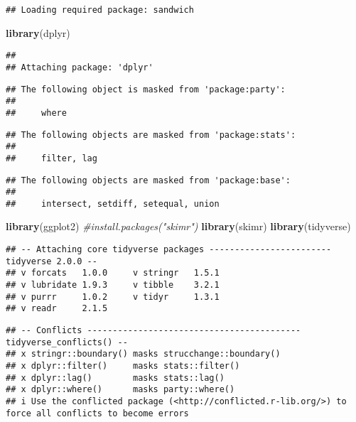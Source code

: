 \documentclass[
]{article}
\newenvironment{Shaded}{\begin{snugshade}}{\end{snugshade}}
\newcommand{\CommentTok}[1]{\textcolor[rgb]{0.56,0.35,0.01}{\textit{#1}}}
\newcommand{\FunctionTok}[1]{\textcolor[rgb]{0.13,0.29,0.53}{\textbf{#1}}}
\newcommand{\NormalTok}[1]{#1}
\begin{document}
\begin{verbatim}
## Loading required package: sandwich
\end{verbatim}

\begin{Shaded}
\begin{Highlighting}[]
\FunctionTok{library}\NormalTok{(dplyr)}
\end{Highlighting}
\end{Shaded}

\begin{verbatim}
## 
## Attaching package: 'dplyr'
\end{verbatim}

\begin{verbatim}
## The following object is masked from 'package:party':
## 
##     where
\end{verbatim}

\begin{verbatim}
## The following objects are masked from 'package:stats':
## 
##     filter, lag
\end{verbatim}

\begin{verbatim}
## The following objects are masked from 'package:base':
## 
##     intersect, setdiff, setequal, union
\end{verbatim}

\begin{Shaded}
\begin{Highlighting}[]
\FunctionTok{library}\NormalTok{(ggplot2)}
\CommentTok{\#install.packages("skimr")}
\FunctionTok{library}\NormalTok{(skimr)}
\FunctionTok{library}\NormalTok{(tidyverse)}
\end{Highlighting}
\end{Shaded}

\begin{verbatim}
## -- Attaching core tidyverse packages ------------------------ tidyverse 2.0.0 --
## v forcats   1.0.0     v stringr   1.5.1
## v lubridate 1.9.3     v tibble    3.2.1
## v purrr     1.0.2     v tidyr     1.3.1
## v readr     2.1.5
\end{verbatim}

\begin{verbatim}
## -- Conflicts ------------------------------------------ tidyverse_conflicts() --
## x stringr::boundary() masks strucchange::boundary()
## x dplyr::filter()     masks stats::filter()
## x dplyr::lag()        masks stats::lag()
## x dplyr::where()      masks party::where()
## i Use the conflicted package (<http://conflicted.r-lib.org/>) to force all conflicts to become errors
\end{verbatim}
\end{document}
